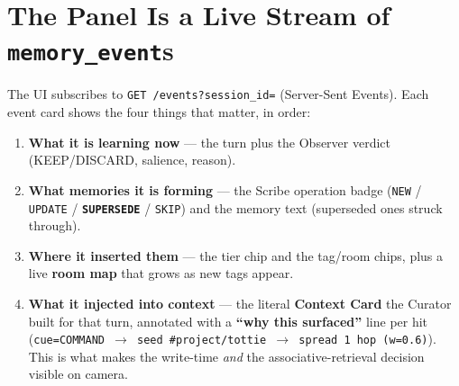 \section{The Panel Is a Live Stream of \texttt{memory\_event}s}
The UI subscribes to \texttt{GET /events?session\_id=} (Server-Sent Events). Each event card shows
the four things that matter, in order:
\begin{enumerate}
  \item \textbf{What it is learning now} --- the turn plus the Observer verdict (KEEP/DISCARD,
  salience, reason).
  \item \textbf{What memories it is forming} --- the Scribe operation badge
  (\texttt{NEW} / \texttt{UPDATE} / \textbf{\texttt{SUPERSEDE}} / \texttt{SKIP}) and the memory text
  (superseded ones struck through).
  \item \textbf{Where it inserted them} --- the tier chip and the tag/room chips, plus a live
  \textbf{room map} that grows as new tags appear.
  \item \textbf{What it injected into context} --- the literal \textbf{Context Card} the Curator
  built for that turn, annotated with a \textbf{``why this surfaced''} line per hit
  (\texttt{cue=COMMAND $\rightarrow$ seed \#project/tottie $\rightarrow$ spread 1 hop (w=0.6)}). This
  is what makes the write-time \emph{and} the associative-retrieval decision visible on camera.
\end{enumerate}

